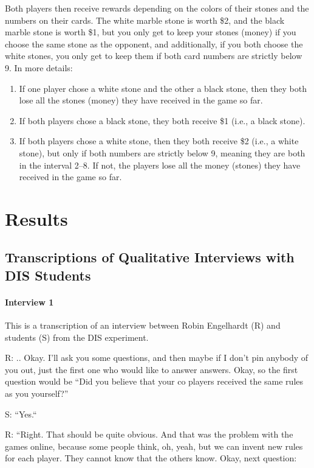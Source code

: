Both players then receive rewards depending on the colors of their stones and the numbers on their cards. The white marble stone is worth \$2, and the black marble stone is worth \$1, but you only get to keep your stones (money) if you choose the same stone as the opponent, and additionally, if you both choose the white stones, you only get to keep them if both card numbers are strictly below 9. In more details:  
\begin{enumerate}
\item[a)] If one player chose a white stone and the other a black stone, then they both lose all the stones (money) they have received in the game so far.
\item[b)] If both players chose a black stone, they both receive \$1 (i.e., a black stone).
\item[c)] If both players chose a white stone, then they both receive \$2 (i.e., a white stone), but only if both numbers are strictly below 9, meaning they are both in the interval 2--8. If not, the players lose all the money (stones) they have received in the game so far.
\end{enumerate} 

\section{Results} 

\subsection{Transcriptions of Qualitative Interviews with DIS Students}


\paragraph{Interview 1}
This is a transcription of an interview between Robin Engelhardt (R) and students (S) from the DIS experiment.


\medskip
R: .. Okay. I'll ask you some questions, and then maybe if I don't pin anybody of you out, just the first one who would like to answer answers. Okay, so the first question would be 
“Did you believe that your co players received the same rules as you yourself?” 

S: “Yes.“

R: “Right. That should be quite obvious. And that was the problem with the games online, because some people think, oh, yeah, but we can invent new rules for each player. They cannot know that the others know. Okay, next question:

